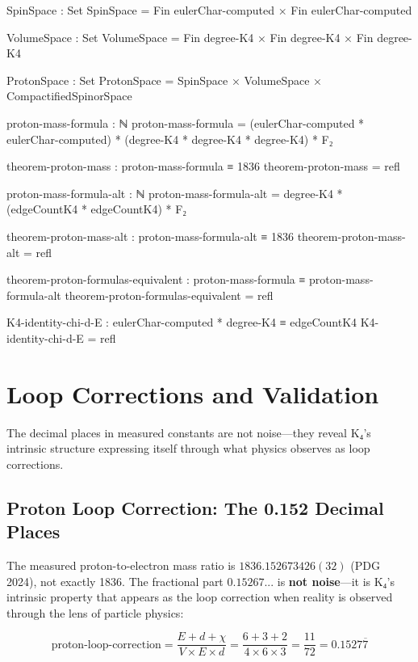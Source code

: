 \documentclass[11pt,a4paper]{book}
\begin{document}
\begin{code}
SpinSpace : Set
SpinSpace = Fin eulerChar-computed × Fin eulerChar-computed

VolumeSpace : Set
VolumeSpace = Fin degree-K4 × Fin degree-K4 × Fin degree-K4

ProtonSpace : Set
ProtonSpace = SpinSpace × VolumeSpace × CompactifiedSpinorSpace

proton-mass-formula : ℕ
proton-mass-formula = (eulerChar-computed * eulerChar-computed) * (degree-K4 * degree-K4 * degree-K4) * F₂

theorem-proton-mass : proton-mass-formula ≡ 1836
theorem-proton-mass = refl

proton-mass-formula-alt : ℕ
proton-mass-formula-alt = degree-K4 * (edgeCountK4 * edgeCountK4) * F₂

theorem-proton-mass-alt : proton-mass-formula-alt ≡ 1836
theorem-proton-mass-alt = refl

theorem-proton-formulas-equivalent : proton-mass-formula ≡ proton-mass-formula-alt
theorem-proton-formulas-equivalent = refl

K4-identity-chi-d-E : eulerChar-computed * degree-K4 ≡ edgeCountK4
K4-identity-chi-d-E = refl
\end{code}


\chapter{Loop Corrections and Validation}
\label{chap:loop-corrections}

The decimal places in measured constants are not noise---they reveal K₄'s intrinsic structure expressing itself through what physics observes as loop corrections.

\section{Proton Loop Correction: The 0.152 Decimal Places}

The measured proton-to-electron mass ratio is $1836.152673426(32)$ (PDG 2024), not exactly 1836.
The fractional part $0.15267...$ is \textbf{not noise}---it is K₄'s intrinsic property that appears as the loop correction when reality is observed through the lens of particle physics:

\[
\text{proton-loop-correction} = \frac{E + d + \chi}{V \times E \times d} = \frac{6 + 3 + 2}{4 \times 6 \times 3} = \frac{11}{72} = 0.1527\overline{7}
\]
\end{document}
